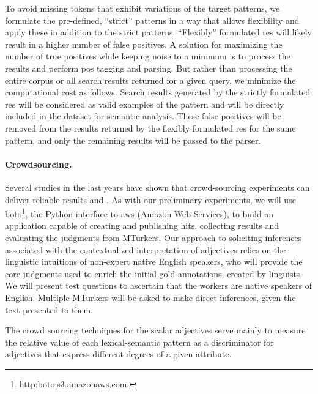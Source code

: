 \documentclass[10pt]{article}
\begin{document}
To avoid missing tokens that exhibit variations of the target patterns, we formulate the pre-defined, ``strict'' patterns in a way that allows flexibility and apply these in addition to the strict patterns. ``Flexibly'' formulated {\sc re}s will likely result in a higher number of false positives. A solution for maximizing the number of true positives while keeping noise to a minimum  is to process the results and perform {\sc pos} tagging and parsing. But rather than processing the entire corpus or all search results returned for a given query, we minimize the computational cost as follows. Search results generated by the strictly formulated {\sc re}s will be considered as valid examples of the pattern and will be directly included in the dataset for semantic analysis. These false positives will be removed from the results returned by the flexibly formulated {\sc re}s for the same pattern, and only the remaining results will be passed to the parser.

\paragraph{Crowdsourcing.}
Several studies in the last years have shown that crowd-sourcing experiments can deliver reliable results \cite{snow:08} and \cite{munroetal2010}. As with our preliminary experiments, we will use boto\footnote{http:boto.s3.amazonaws.com.}, the Python
interface to {\sc aws} (Amazon Web Services), to build an application capable of creating and publishing {\sc hit}s, collecting results and evaluating the 
judgments from MTurkers. Our approach to soliciting inferences associated with the
contextualized interpretation of adjectives relies on the linguistic
intuitions of non-expert native English speakers, who will provide the
core judgments used to enrich the initial gold annotations, created by
linguists. We will present test questions to ascertain that the workers are native speakers of English. Multiple MTurkers will be asked to make direct inferences, given the text presented to them. 


The crowd sourcing techniques for the scalar adjectives serve mainly to measure the relative value of each lexical-semantic pattern as a discriminator for adjectives that express different 
degrees of a given attribute. 

\end{document}
